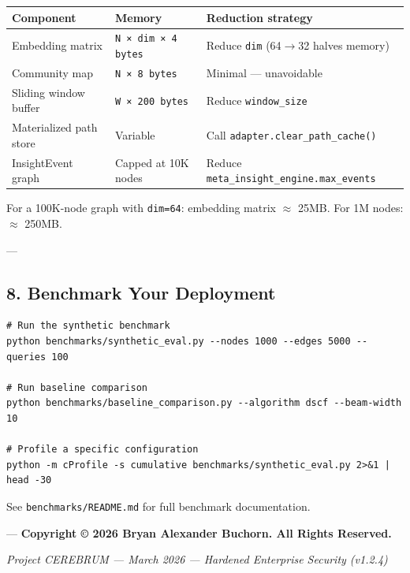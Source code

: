 \documentclass[11pt,article,oneside]{memoir}
\begin{document}
\begin{center}
{\footnotesize
\begin{tabularx}{\columnwidth}{|>{\raggedright\arraybackslash}X|>{\raggedright\arraybackslash}X|>{\raggedright\arraybackslash}X|}
\hline
Component & Memory & Reduction strategy \\ \hline
Embedding matrix & \texttt{N × dim × 4 bytes} & Reduce \texttt{dim} (64$\to$32 halves memory) \\ \hline
Community map & \texttt{N × 8 bytes} & Minimal — unavoidable \\ \hline
Sliding window buffer & \texttt{W × 200 bytes} & Reduce \texttt{window\_size} \\ \hline
Materi\-alized path store & Variable & Call \texttt{adapter.clear\_path\_cache()} \\ \hline
InsightEvent graph & Capped at 10K nodes & Reduce \texttt{meta\_insight\_engine.max\_events} \\ \hline
\end{tabularx}
}
\end{center}

For a 100K-node graph with \texttt{dim=64}: embedding matrix $\approx$ 25MB. For 1M nodes: $\approx$ 250MB.

---

\subsection{8. Benchmark Your Deployment}

\begin{lstlisting}
# Run the synthetic benchmark
python benchmarks/synthetic_eval.py --nodes 1000 --edges 5000 --queries 100

# Run baseline comparison
python benchmarks/baseline_comparison.py --algorithm dscf --beam-width 10

# Profile a specific configuration
python -m cProfile -s cumulative benchmarks/synthetic_eval.py 2>&1 | head -30
\end{lstlisting}

See \texttt{benchmarks/README.md} for full benchmark docum\-entation.

---
\textbf{Copyright © 2026 Bryan Alexander Buchorn. All Rights Reserved.}


\vspace{3em}
\begin{center}
    \small \textit{Project CEREBRUM — March 2026 — Hardened Enterprise Security (v1.2.4)}
\end{center}
\end{document}
